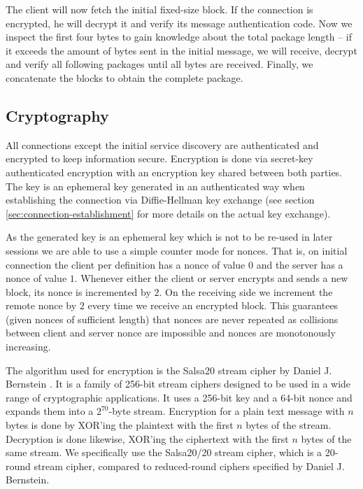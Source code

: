 The client will now fetch the initial fixed-size block.
If the connection is encrypted, he will decrypt it and verify its message authentication code.
Now we inspect the first four bytes to gain knowledge about the total package length -- if it exceeds the amount of bytes sent in the initial message, we will receive, decrypt and verify all following packages until all bytes are received.
Finally, we concatenate the blocks to obtain the complete package.

\subsection{Cryptography}

All connections except the initial service discovery are authenticated and encrypted to keep information secure.
Encryption is done via secret-key authenticated encryption with an encryption key shared between both parties.
The key is an ephemeral key generated in an authenticated way when establishing the connection via Diffie-Hellman key exchange (see section \ref{sec:connection-establishment} for more details on the actual key exchange).

As the generated key is an ephemeral key which is not to be re-used in later sessions we are able to use a simple counter mode for nonces.
That is, on initial connection the client per definition has a nonce of value $0$ and the server has a nonce of value $1$.
Whenever either the client or server encrypts and sends a new block, its nonce is incremented by $2$.
On the receiving side we increment the remote nonce by $2$ every time we receive an encrypted block.
This guarantees (given nonces of sufficient length) that nonces are never repeated as collisions between client and server nonce are impossible and nonces are monotonously increasing.

The algorithm used for encryption is the Salsa20 stream cipher by Daniel J. Bernstein \cite{bernstein2008salsa}.
It is a family of 256-bit stream ciphers designed to be used in a wide range of cryptographic applications.
It uses a 256-bit key and a 64-bit nonce and expands them into a $2^{70}$-byte stream.
Encryption for a plain text message with $n$ bytes is done by XOR'ing the plaintext with the first $n$ bytes of the stream.
Decryption is done likewise, XOR'ing the ciphertext with the first $n$ bytes of the same stream.
We specifically use the Salsa20/20 stream cipher, which is a 20-round stream cipher, compared to reduced-round ciphers specified by Daniel J. Bernstein.

